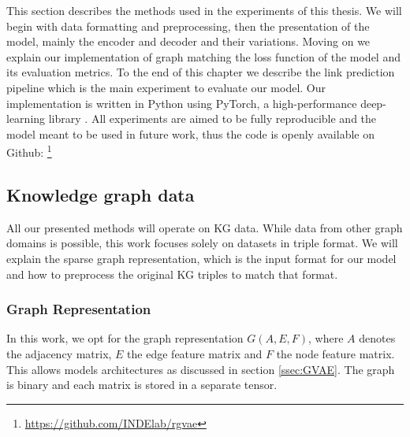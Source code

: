 This section describes the methods used in the experiments of this thesis. We will begin with data formatting and preprocessing, then the presentation of the model, mainly the encoder and decoder and their variations. Moving on we explain our implementation of graph matching the loss function of the model and its evaluation metrics. To the end of this chapter we describe the link prediction pipeline which is the main experiment to evaluate our model. Our implementation is written in Python using PyTorch, a high-performance deep-learning library \cite{paszke_pytorch_2019}. All experiments are aimed to be fully reproducible and the model meant to be used in future work, thus the code is openly available on Github: \footnote{\url{https://github.com/INDElab/rgvae}}

\subsection{Knowledge graph data}
All our presented methods will operate on KG data. While data from other graph domains is possible, this work focuses solely on datasets in triple format. We will explain the sparse graph representation, which is the input format for our model and how to preprocess the original KG triples to match that format.

\subsubsection{Graph Representation}


In this work, we opt for the graph representation $G(A,E,F)$, where $A$ denotes the adjacency matrix, $E$ the edge feature matrix and $F$ the node feature matrix. This allows models architectures as discussed in section \ref{ssec:GVAE}. The graph is binary and each matrix is stored in a separate tensor.

